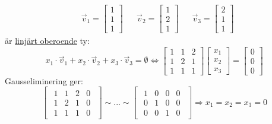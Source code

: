 \begin{Ex}
	\begin{align*}
	&\vec{v}_1 = \begin{bmatrix} 1\\1\\1 \end{bmatrix}
	&&\vec{v}_2	= \begin{bmatrix} 1\\2\\1 \end{bmatrix}
	&&\vec{v}_3 = \begin{bmatrix} 2\\1\\1 \end{bmatrix}
	\end{align*}
	är \underline{linjärt oberoende} ty:
	\[
	x_1 \cdot \vec{v}_1 + x_2 \cdot \vec{v}_2 + x_3 \cdot \vec{v}_3 = \emptyset \Leftrightarrow \begin{bmatrix} 1 & 1 & 2\\1 & 2 & 1\\1&1&1 \end{bmatrix}\begin{bmatrix} x_1\\x_2\\x_3 \end{bmatrix} = \begin{bmatrix} 0\\0\\0 \end{bmatrix}
	\]
	Gausseliminering ger:
	\[
	\begin{bmatrix}
		\begin{array}{ccc|c}
			1 & 1 & 2 & 0\\
			1 & 2 & 1 & 0\\
			1 & 1 & 1 & 0
		\end{array}
	\end{bmatrix} \sim ... \sim
	\begin{bmatrix}
		\begin{array}{ccc|c}
			1 & 0 & 0 & 0\\
			0 & 1 & 0 & 0\\
			0 & 0 & 1 & 0
		\end{array}
	\end{bmatrix} \Rightarrow x_1 = x_2 = x_3 = 0
	\]
\end{Ex}
